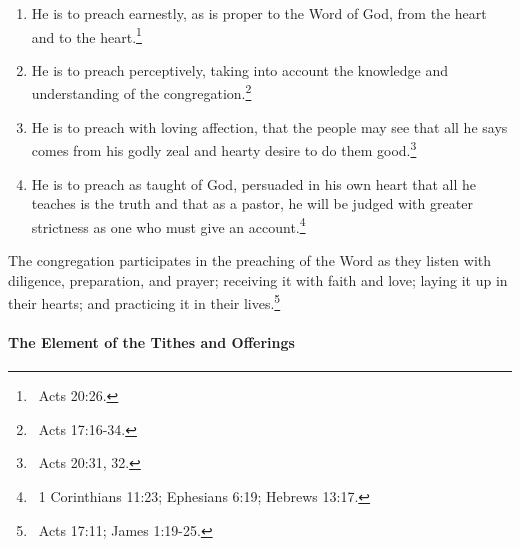 \begin{outerlst}[left=0pt,labelsep=0pt]
\begin{innerlst}[resume*]
\begin{enumerate}[label=\alph*)]
            \item He is to preach earnestly, as is proper to the Word of God, from the heart and to the heart.\footnote{\ Acts 20:26.} 
            \item He is to preach perceptively, taking into account the knowledge and understanding of the congregation.\footnote{\ Acts 17:16-34.} 
            \item He is to preach with loving affection, that the people may see that all he says comes from his godly zeal and hearty desire to do them good.\footnote{\ Acts 20:31, 32.} 
            \item He is to preach as taught of God, persuaded in his own heart that all he teaches is the truth and that as a pastor, he will be judged with greater strictness as one who must give an account.\footnote{\ 1 Corinthians 11:23; Ephesians 6:19; Hebrews 13:17.} 
      \end{enumerate} 
      \item The congregation participates in the preaching of the Word as they listen with diligence, preparation, and prayer; receiving it with faith and love; laying it up in their hearts; and practicing it in their lives.\footnote{\ Acts 17:11; James 1:19-25.} 
\end{innerlst} 

\paragraph[The Element of the Tithes and Offerings]{The Element of the Tithes and Offerings}   


\end{outerlst}
